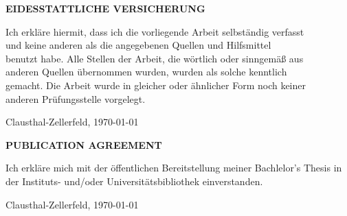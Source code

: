 \begin{center}
\Large\textbf{EIDESSTATTLICHE VERSICHERUNG}
\end{center}

\vspace{1cm}

Ich erkläre hiermit, dass ich die vorliegende Arbeit selbständig verfasst\\
und keine anderen als die angegebenen Quellen und Hilfsmittel\\
benutzt habe. Alle Stellen der Arbeit, die wörtlich oder sinngemäß aus\\
anderen Quellen übernommen wurden, wurden als solche kenntlich\\
gemacht. Die Arbeit wurde in gleicher oder ähnlicher Form noch keiner\\
anderen Prüfungsstelle vorgelegt.

\vspace{1cm}

Clausthal-Zellerfeld, \today

\vspace{1cm}

\noindent\hfill\makebox[5cm]{\hrulefill}

\noindent\hfill{}

\vspace{5cm}

\begin{center}
\Large\textbf{PUBLICATION AGREEMENT}
\end{center}

\vspace{1cm}

Ich erkläre mich mit der öffentlichen Bereitstellung meiner Bachlelor's Thesis in der Instituts- und/oder Universitätsbibliothek einverstanden.

\vspace{1cm}

Clausthal-Zellerfeld, \today

\vspace{1cm}

\noindent\hfill\makebox[5cm]{\hrulefill}

\noindent\hfill{}
